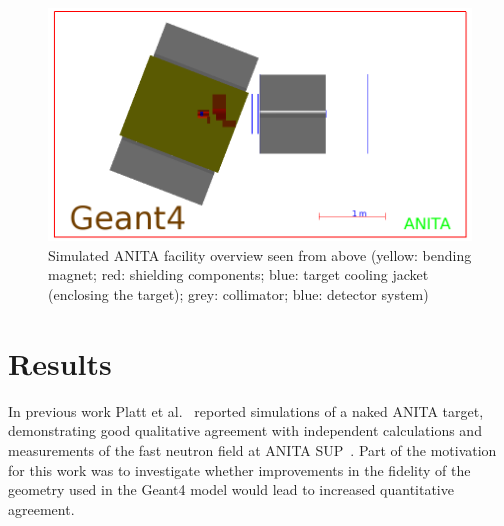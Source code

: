 \documentclass[11pt,a4paper]{IEEEtran}
\let\MYoriglatexcaption\caption
\renewcommand{\caption}[2][\relax]{\MYoriglatexcaption[#2]{#2}}
\begin{document}
\begin{figure}[t]
	\centering
	\includegraphics[width=\columnwidth]{overview.png}
	\caption{
        Simulated ANITA facility overview seen from above (yellow: bending magnet; red: shielding components; blue: target cooling jacket (enclosing the target); grey: collimator; blue: detector system)
    }
	\label{fig:ANITAoverview}
\end{figure}

\section{Results}
In previous work Platt et al.~\cite{Platt13} reported simulations of a naked ANITA target, demonstrating good qualitative agreement with independent calculations and measurements of the fast neutron field at ANITA SUP~\cite{Prokofiev2009}.
Part of the motivation for this work was to investigate whether improvements in the fidelity of the geometry used in the Geant4 model would lead to increased quantitative agreement.
\end{document}
